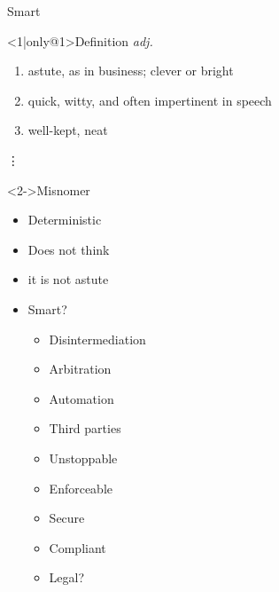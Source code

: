 \documentclass[pdf,table]{beamer}
\begin{document}
\begin{frame}{Smart}
	\begin{block}<1|only@1>{Definition {\it adj.} \cite{collinsDictionary}}
		\begin{enumerate}
			\item astute, as in business; clever or bright
			\item quick, witty, and often impertinent in speech
			\item well-kept, neat
		\end{enumerate}
		\vdots
	\end{block}
	\begin{block}<2->{Misnomer}
		\begin{itemize}
			\item Deterministic
			\item Does not think
			\item it is not astute
			\item Smart?
				\begin{itemize}
					\item<3-> Disintermediation
					\item<3-> Arbitration
					\item<3-> Automation
					\item<3-> Third parties
					\item<3-> Unstoppable
					\item<3-> Enforceable
					\item<3-> Secure
					\item<3-> Compliant
					\item<3-> Legal?
				\end{itemize}
		\end{itemize}
	\end{block}
\end{frame}
\end{document}
